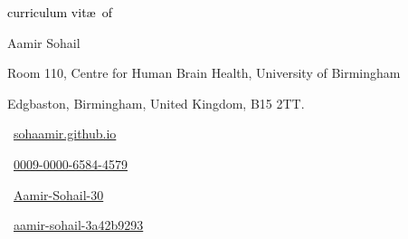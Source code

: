 \begin{scriptsize}
	 \textcolor{black}{curriculum vit\ae~of}
\end{scriptsize}

\begin{Large} 
	Aamir Sohail
\end{Large}

\vspace*{0.4em}
\begin{scshape}
	\begin{scriptsize}
		  \textcolor{highlight2}{Room 110, Centre for Human Brain Health, University of Birmingham}
		  
		  \vspace*{-1ex}
		  \textcolor{highlight2}{Edgbaston,
		  	Birmingham, United Kingdom, B15 2TT.}
	\end{scriptsize}
\end{scshape}
\vspace*{0.25cm}

\begin{footnotesize}
	\begin{tiny}\faHome\end{tiny}~\href{https://sohaamir.github.io}
	{sohaamir.github.io
	}
	\quad {} 
	
	
	\begin{tiny}\aiOrcid\end{tiny}~\href{https://orcid.org/my-orcid?emailVerified=true&orcid=0009-0000-6584-4579}{0009-0000-6584-4579}
	\quad 
	\begin{tiny}\aiResearchGate\end{tiny}~\href{https://www.researchgate.net/profile/Aamir-Sohail-30}{Aamir-Sohail-30}
		\quad
	\begin{tiny}\faLinkedin\end{tiny}~\href{https://www.linkedin.com/in/aamir-sohail-3a42b9293}{aamir-sohail-3a42b9293}
	

\end{footnotesize}